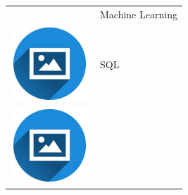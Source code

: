 \documentclass{article}
\begin{document}
\begin{paracol}{2}
\begin{tabular}{ll}
\begin{minipage}{0.1\linewidth}
         \end{minipage} & Machine Learning \\[10pt]
         \begin{minipage}{0.1\linewidth}
         \includegraphics[width=\linewidth]{picon.png}
         \end{minipage} & SQL \\[10pt]
         \begin{minipage}{0.1\linewidth}
         \includegraphics[width=\linewidth]{picon.png}

\end{minipage}
\end{tabular}
\end{paracol}
\end{document}
